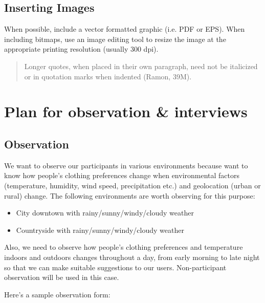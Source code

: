 \documentclass{sigchi}
\begin{document}
\subsection{Inserting Images}
When possible, include a vector formatted graphic (i.e. PDF or EPS).
When including bitmaps,  use an image editing tool to resize the image
at the appropriate printing resolution (usually 300 dpi).
\begin{quote}
Longer quotes, when placed in their own paragraph, need not be
italicized or in quotation marks when indented (Ramon, 39M).  
\end{quote}
\fi

\section{Plan for observation \& interviews}
\subsection{Observation}
We want to observe our participants in various environments because want to know how people's clothing preferences change when environmental factors (temperature, humidity, wind speed, precipitation etc.) and geolocation (urban or rural) change. The following environments are worth observing for this purpose:
\begin{itemize}
    \item City downtown with rainy/sunny/windy/cloudy weather
    \item Countryside with  rainy/sunny/windy/cloudy weather
\end{itemize}
Also, we need to observe how people's clothing preferences and temperature indoors and outdoors changes throughout a day, from early morning to late night so that we can make suitable suggestions to our users. Non-participant observation will be used in this case. 

Here's a sample observation form:
\begin{table}[h]
\end{table}
\end{document}
